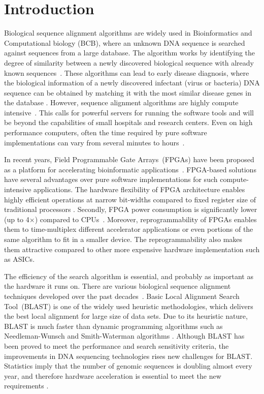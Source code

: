 \section{Introduction}
\label{sec:introduction}

Biological sequence alignment algorithms are widely used in Bioinformatics and Computational biology (BCB), where an unknown DNA sequence is searched against sequences from a large database. 
The algorithm works by identifying the degree of similarity between a newly discovered biological sequence with already known sequences~\cite{kasap2008design}.
These algorithms can lead to early disease diagnosis, where the biological information of a newly discovered infectant (virus or bacteria) DNA sequence can be obtained by matching it with the most similar disease genes in the database \cite{guo2012systolic}. 
However, sequence alignment algorithms are highly compute intensive~\cite{datta2009}. 
This calls for powerful servers for running the software tools and will be beyond the capabilities of small hospitals and research centers.
Even on high performance computers, often the time required by pure software implementations can vary from several minutes to hours~\cite{masato2016}.  

In recent years, Field Programmable Gate Arrays~(FPGAs) have been proposed as a platform for accelerating bioinformatic applications~\cite{kasap2008design}. 
FPGA-based solutions have several advantages over pure software implementations for such compute-intensive applications.
The hardware flexibility of FPGA architecture enables highly efficient operations at narrow bit-widths compared to fixed register size of traditional processors \cite{cug2007}. 
Secondly, FPGA power consumption is significantly lower (up to 4$\times$) compared to CPUs~\cite{cug2007}. 
Moreover, reprogrammability of FPGAs enables them to time-multiplex different accelerator applications or even portions of the same algorithm to fit in a smaller device. 
The reprogrammability also makes them attractive compared to other more expensive hardware implementation such as ASICs. 

The efficiency of the search algorithm is essential, and probably as important as the hardware it runs on. 
There are various biological sequence alignment techniques developed over the past decades~\cite{mohd2013}. 
Basic Local Alignment Search Tool~(BLAST) is one of the widely used heuristic methodologies, which delivers the best local alignment for large size of data sets. 
Due to its heuristic nature, BLAST is much faster than dynamic programming algorithms such as Needleman-Wunsch and Smith-Waterman algorithms \cite{wien2011blastp}. 
Although BLAST has been proved to meet the performance and search sensitivity criteria, the improvements in DNA sequencing technologies rises new challenges for BLAST. 
Statistics imply that the number of genomic sequences is doubling almost every year, and therefore hardware acceleration is essential to meet the new requirements \cite{wien2011blastp}. 

